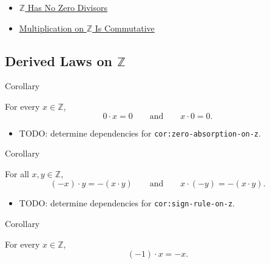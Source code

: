 \begin{dependencies}
\begin{itemize}
  \item \hyperref[thm:z-has-no-zero-divisors]{$\mathbb{Z}$ Has No Zero Divisors}
  \item \hyperref[thm:multiplication-on-z-commutative]{Multiplication on $\mathbb{Z}$ Is Commutative}
\end{itemize}
\end{dependencies}

\subsection*{Derived Laws on $\mathbb{Z}$}

\begin{corollarybox}{Corollary}
\begin{corollary}
\label{cor:zero-absorption-on-z}
For every $x\in\mathbb{Z}$,
\[
0\cdot x=0
\qquad\text{and}\qquad
x\cdot 0=0.
\]
\end{corollary}
\end{corollarybox}

\begin{dependencies}
\begin{itemize}
  \item TODO: determine dependencies for \texttt{cor:zero-absorption-on-z}.
\end{itemize}
\end{dependencies}

\begin{corollarybox}{Corollary}
\begin{corollary}
\label{cor:sign-rule-on-z}
For all $x,y\in\mathbb{Z}$,
\[
(-x)\cdot y=-(x\cdot y)
\qquad\text{and}\qquad
x\cdot(-y)=-(x\cdot y).
\]
\end{corollary}
\end{corollarybox}

\begin{dependencies}
\begin{itemize}
  \item TODO: determine dependencies for \texttt{cor:sign-rule-on-z}.
\end{itemize}
\end{dependencies}

\begin{corollarybox}{Corollary}
\begin{corollary}
\label{cor:negative-one-rule-on-z}
For every $x\in\mathbb{Z}$,
\[
(-1)\cdot x=-x.
\]
\end{corollary}
\end{corollarybox}

